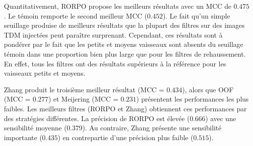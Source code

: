 Quantitativement, RORPO propose les meilleurs résultats avec un MCC de $0.475$. Le témoin remporte le second meilleur MCC ($0.452$). Le fait qu'un simple seuillage produise de meilleurs résultats que la plupart des filtres sur des images TDM injectées peut paraître surprenant. Cependant, ces résultats sont à pondérer par le fait que les petits et moyens vaisseaux sont absents du seuillage témoin dans une proportion bien plus large que pour les filtres de rehaussement. En effet, tous les filtres ont des résultats supérieurs à la référence pour les vaisseaux petits et moyens.  

Zhang produit le troisième meilleur résultat (MCC = $0.434$), alors que OOF (MCC = $0.277$) et Meijering (MCC = $0.231$) présentent les performances les plus faibles. Les meilleurs filtres (RORPO et Zhang) obtiennent ces performances par des stratégies différentes. La précision de RORPO est élevée ($0.666$) avec une sensibilité moyenne ($0.379$). Au contraire, Zhang présente une sensibilité importante ($0.435$) en contrepartie d'une précision plus faible ($0.515$).

